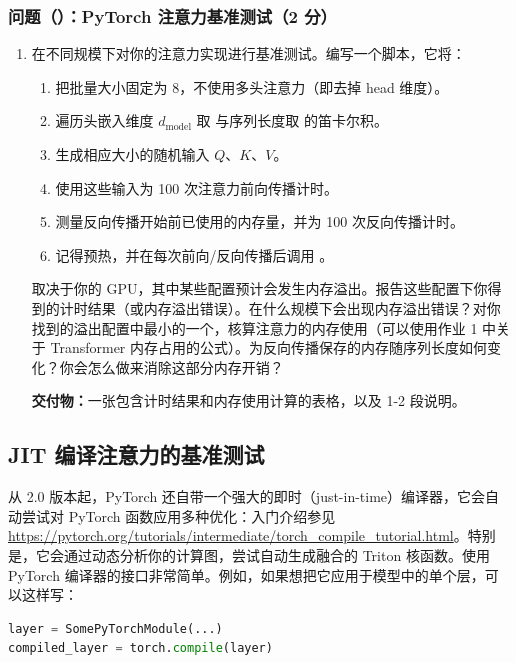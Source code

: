 \subsubsection*{问题（）：PyTorch 注意力基准测试（2 分）}

\begin{enumerate}[label=(\alph*)]
  \item 在不同规模下对你的注意力实现进行基准测试。编写一个脚本，它将：
  \begin{enumerate}[label=(\roman*)]
    \item 把批量大小固定为 8，不使用多头注意力（即去掉 head 维度）。
    \item 遍历头嵌入维度 $d_{\text{model}}$ 取 \tm{[16, 32, 64, 128]} 与序列长度取 \tm{[256, 1024, 4096, 8192, 16384]} 的笛卡尔积。
    \item 生成相应大小的随机输入 $Q$、$K$、$V$。
    \item 使用这些输入为 100 次注意力前向传播计时。
    \item 测量反向传播开始前已使用的内存量，并为 100 次反向传播计时。
    \item 记得预热，并在每次前向/反向传播后调用 。
  \end{enumerate}

  取决于你的 GPU，其中某些配置预计会发生内存溢出。报告这些配置下你得到的计时结果（或内存溢出错误）。在什么规模下会出现内存溢出错误？对你找到的溢出配置中最小的一个，核算注意力的内存使用（可以使用作业 1 中关于 Transformer 内存占用的公式）。为反向传播保存的内存随序列长度如何变化？你会怎么做来消除这部分内存开销？

  \textbf{交付物：}一张包含计时结果和内存使用计算的表格，以及 1-2 段说明。
\end{enumerate}

\subsection{JIT 编译注意力的基准测试}

从 2.0 版本起，PyTorch 还自带一个强大的即时（just-in-time）编译器，它会自动尝试对 PyTorch 函数应用多种优化：入门介绍参见 \url{https://pytorch.org/tutorials/intermediate/torch_compile_tutorial.html}。特别是，它会通过动态分析你的计算图，尝试自动生成融合的 Triton 核函数。使用 PyTorch 编译器的接口非常简单。例如，如果想把它应用于模型中的单个层，可以这样写：

\begin{lstlisting}[language=Python]
layer = SomePyTorchModule(...)
compiled_layer = torch.compile(layer)
\end{lstlisting}

